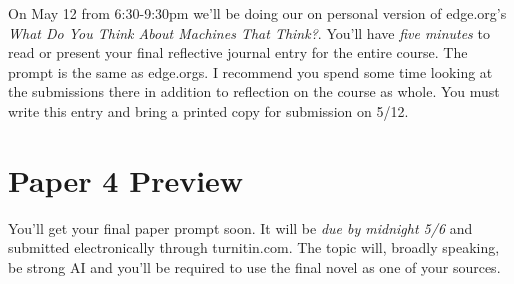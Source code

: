 \documentclass[]{tufte-handout}
\begin{document}
On May 12 from 6:30-9:30pm we'll be doing our on personal version of edge.org's \textit{What Do You Think About Machines That Think?}.  You'll have \textit{five minutes} to read or present your final reflective journal entry for the entire course. The prompt is the same as edge.orgs. I recommend you spend some time looking at the submissions there in addition to reflection on the course as whole. You must write this entry and bring a printed copy for submission on 5/12.  

\section{Paper 4 Preview}

You'll get your final paper prompt soon. It will be \textit{due by midnight 5/6} and submitted electronically through turnitin.com. The topic will, broadly speaking, be strong AI and you'll be required to use the final novel as one of your sources. 



\end{document}
